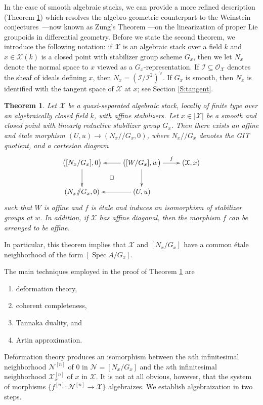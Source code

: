 \documentclass[a4paper]{amsart}
\theoremstyle{plain}
\newtheorem{theorem}{Theorem}[section]
\theoremstyle{definition}
\theoremstyle{remark}
\numberwithin{equation}{section}
\newcommand\cI{\mathcal{I}}
\newcommand\cN{\mathcal{N}}
\newcommand\cX{\mathcal{X}}
\newcommand\oh{\mathcal{O}}
\DeclareMathOperator{\Spec}{Spec}
\newcommand{\gitq}{/\!\!/}
\begin{document}
In the case of smooth algebraic stacks, we can provide a more refined description (Theorem \ref{T:smooth}) which  
resolves the algebro-geometric counterpart to the Weinstein 
conjectures~\cite{weinstein_linearization}---now known as Zung's Theorem 
\cite{zung_proper_grpds,MR2776372,MR3185351,MR3259039}---on the linearization of 
proper Lie groupoids in differential geometry.  Before we state the second theorem, we introduce the following notation: 
if $\cX$ is an algebraic stack over a field $k$ and $x\in \cX(k)$ is a closed
point with stabilizer group scheme $G_x$, then we let $N_x$ denote the normal
space to $x$ viewed as a $G_x$-representation. If $\cI \subseteq \oh_{\cX}$
denotes the sheaf of ideals defining $x$, then $N_{x} = (\cI/\cI^2)^\vee$.  If
$G_x$ is smooth, then $N_{x}$ is identified with the tangent space of $\cX$ at
$x$; see Section \ref{S:tangent}.





\begin{theorem}\label{T:smooth}
Let $\cX$ be a quasi-separated algebraic stack, locally 
of finite type over an algebraically closed field $k$, with affine stabilizers.  Let $x \in |\cX|$ be a smooth and closed point with linearly reductive stabilizer
  group $G_x$. Then there exists an affine and \'etale morphism $(U,u) \to (N_x \gitq G_x,0)$, where  $N_{x} \gitq G_x$ denotes the GIT quotient, and a cartesian diagram
 $$\xymatrix{
 \bigl([N_{x}/G_x],0\bigr) \ar[d] & \bigl([W / G_x],w\bigr)\ar[r]^-f \ar[d] \ar[l]	& (\cX,x) \\
 (N_{x} \gitq G_x,0) & (U,u) \ar[l]	\ar@{}[ul]|\square				& 
}$$
such that $W$ is affine and $f$ is \'etale and induces an isomorphism
    of stabilizer groups at $w$. In addition, if $\cX$ has affine diagonal, then the morphism $f$ can be
  arranged to be affine.
\end{theorem}

In particular, this theorem implies that $\cX$ and $[N_{x} /G_x]$ have a common \'etale 
neighborhood of the form $[\Spec A / G_x]$. 

The main techniques employed in the proof of Theorem \ref{T:smooth} are
\begin{enumerate}
\item deformation theory,
\item coherent completeness,
\item Tannaka duality, and
\item Artin approximation.
\end{enumerate}
Deformation theory produces an isomorphism between the $n$th infinitesimal neighborhood $\cN^{[n]}$ of 
$0$ in $\cN = [N_x/G_x]$ and the $n$th infinitesimal neighborhood $\cX^{[n]}_x$ of $x$ in 
$\cX$. It is not at all obvious, however, that the system of morphisms $\{f^{[n]} \colon \cN^{[n]} \to \cX\}$ algebraizes. We establish algebraization in two steps. 
\end{document}
